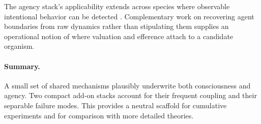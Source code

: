 \documentclass[11pt]{article}
\begin{document}
The agency stack's applicability extends across species where observable intentional behavior can be detected \citep{dennett1987intentional}.
Complementary work on recovering agent boundaries from raw dynamics rather than stipulating them \citep{uad2025} supplies an operational notion of where valuation and efference attach to a candidate organism. 


\paragraph{Summary.} A small set of shared mechanisms plausibly underwrite both consciousness and agency. Two compact add-on stacks account for their frequent coupling and their separable failure modes. This provides a neutral scaffold for cumulative experiments and for comparison with more detailed theories.



\end{document}
